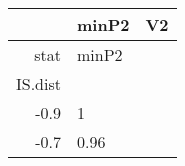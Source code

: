 \begin{table}[ht]
\centering
\begingroup\tiny
\begin{tabular}{rll}
  \hline
 & minP2 & V2 \\ 
  \hline
stat & minP2 &  \\ 
  IS.dist &  &  \\ 
  -0.9 & 1 &  \\ 
  -0.7 & 0.96 &  \\ 
   \hline
\end{tabular}
\endgroup
\end{table}
